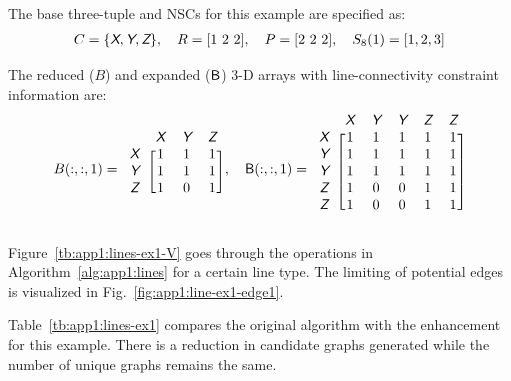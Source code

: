 The base three-tuple and NSCs for this example are specified as:
\begin{align}
C = \{ \textsl{\textsf{X}}, \textsl{\textsf{Y}}, \textsl{\textsf{Z}} \}, \quad R = [1\ 2\ 2], \quad P = [2\ 2\ 2], \quad S_8(1) = [1,2,3]
\end{align}

\noindent The reduced ($B$) and expanded ($\textup{\textsf{B}}$) 3-D arrays with line-connectivity constraint information are:
\vspace{-0.1in}
\begin{align}
B(:,:,1) =
\begin{blockarray}{cccc}
& \xcolor{X} & \xcolor{Y} & \xcolor{Z}  \\
\begin{block}{c[ccc]}
\xcolor{X} & 1 & 1 & 1 \\
\xcolor{Y} & 1 & 1 & 1 \\
\xcolor{Z} & 1 & 0 & 1 \\
\end{block}
\end{blockarray}, \quad 
\xvar{B}(:,:,1) =
\begin{blockarray}{cccccc}
& \xcolor{X} & \xcolor{Y} & \xcolor{Y} & \xcolor{Z} & \xcolor{Z}  \\
\begin{block}{c[ccccc]}
\xcolor{X} & 1 & 1 & 1 & 1 & 1  \\
\xcolor{Y} & 1 & 1 & 1 & 1 & 1  \\
\xcolor{Y} & 1 & 1 & 1 & 1 & 1  \\
\xcolor{Z} & 1 & 0 & 0 & 1 & 1  \\
\xcolor{Z} & 1 & 0 & 0 & 1 & 1  \\
\end{block}
\end{blockarray}
\end{align}
\vspace{-2em}

\noindent Figure~\ref{tb:app1:lines-ex1-V} goes through the operations in Algorithm~\ref{alg:app1:lines} for a certain line type.
The limiting of potential edges is visualized in Fig.~\ref{fig:app1:line-ex1-edge1}.

Table~\ref{tb:app1:lines-ex1} compares the original algorithm with the enhancement for this example. There is a reduction in candidate graphs generated while the number of unique graphs remains the same.

\vspace{-0.1in}


